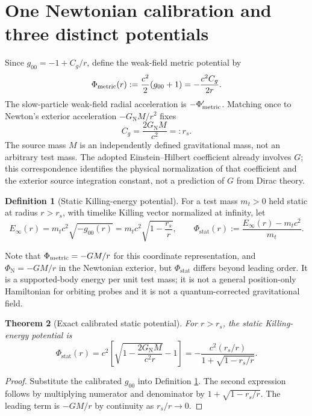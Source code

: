 \documentclass[11pt,a4paper,oneside]{report}
\numberwithin{equation}{chapter}
\newtheorem{theorem}{Theorem}[chapter]
\theoremstyle{definition}\newtheorem{definition}[theorem]{Definition}
\theoremstyle{remark}\newtheorem{remark}[theorem]{Remark}
\newcommand{\Phist}{\Phi_{\mathrm{stat}}}
\newcommand{\Phin}{\Phi_{\mathrm N}}
\newcommand{\GNewton}{G_{\mathrm N}}
\begin{document}
\section{One Newtonian calibration and three distinct potentials}\label{sec:calibration}
Since $g_{00}=-1+C_g/r$, define the weak-field metric potential by
\begin{equation}
 \Phi_{\rm metric}(r):=\frac{c^2}{2}(g_{00}+1)
 =-\frac{c^2C_g}{2r}.
 \label{eq:metricpotential}
\end{equation}
The slow-particle weak-field radial acceleration is $-\Phi_{\rm metric}'$. Matching once to Newton's exterior acceleration $-\GNewton M/r^2$ fixes
\begin{equation}
 \boxed{C_g=\frac{2\GNewton M}{c^2}=:r_s.}
 \label{eq:calibration}
\end{equation}
The source mass $M$ is an independently defined gravitational mass, not an arbitrary test mass. The adopted Einstein--Hilbert coefficient already involves $G$; this correspondence identifies the physical normalization of that coefficient and the exterior source integration constant, not a prediction of $G$ from Dirac theory.

\begin{definition}[Static Killing-energy potential]\label{def:phi}
For a test mass $m_t>0$ held static at radius $r>r_s$, with timelike Killing vector normalized at infinity, let
\begin{equation}
 E_\infty(r)=m_tc^2\sqrt{-g_{00}(r)}
 =m_tc^2\sqrt{1-\frac{r_s}{r}},\qquad
 \boxed{\Phist(r):=\frac{E_\infty(r)-m_tc^2}{m_t}.}
 \label{eq:PhiDef}
\end{equation}
\end{definition}
Note that $\Phi_{\rm metric}=-GM/r$ for this coordinate representation, and $\Phin=-GM/r$ in the Newtonian exterior, but $\Phist$ differs beyond leading order. It is a supported-body energy per unit test mass; it is not a general position-only Hamiltonian for orbiting probes and it is not a quantum-corrected gravitational field.

\begin{theorem}[Exact calibrated static potential]\label{thm:phi}
For $r>r_s$, the static Killing-energy potential is
\begin{equation}
 \boxed{\displaystyle
 \Phist(r)=c^2\left[\sqrt{1-\frac{2\GNewton M}{c^2r}}-1\right]
 =-\frac{c^2(r_s/r)}{1+\sqrt{1-r_s/r}}.}
 \label{eq:PhiExact}
\end{equation}
\end{theorem}
\begin{proof}
Substitute the calibrated $g_{00}$ into Definition \ref{def:phi}. The second expression follows by multiplying numerator and denominator by $1+\sqrt{1-r_s/r}$. The leading term is $-GM/r$ by continuity as $r_s/r\to0$.
\end{proof}
\end{document}
